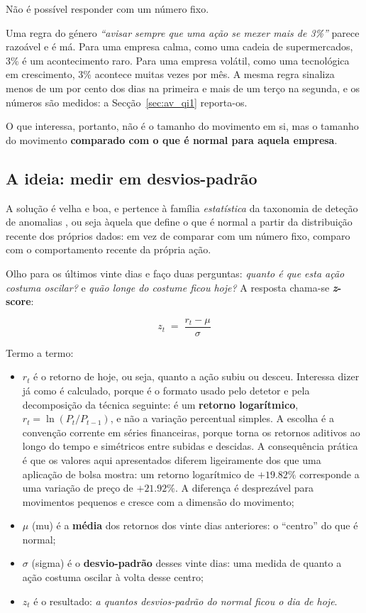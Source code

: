 Não é possível responder com um número fixo.

Uma regra do género \emph{``avisar sempre que uma ação se mexer mais de 3\%''} parece razoável e é
má. Para uma empresa calma, como uma cadeia de supermercados, 3\% é um acontecimento raro. Para uma
empresa volátil, como uma tecnológica em crescimento, 3\% acontece muitas vezes por mês. A mesma
regra sinaliza menos de um por cento dos dias na primeira e mais de um terço na segunda, e os
números são medidos: a Secção~\ref{sec:av_qi1} reporta-os.

O que interessa, portanto, não é o tamanho do movimento em si, mas o tamanho do movimento
\textbf{comparado com o que é normal para aquela empresa}.

\subsection{A ideia: medir em desvios-padrão}

A solução é velha e boa, e pertence à família \emph{estatística} da taxonomia de deteção de anomalias
\autocite{chandola2009anomaly}, ou seja àquela que define o que é normal a partir da distribuição
recente dos próprios dados: em vez de comparar com um número fixo, comparo com o comportamento
recente da própria ação.

Olho para os últimos vinte dias e faço duas perguntas: \emph{quanto é que esta ação costuma oscilar?}
e \emph{quão longe do costume ficou hoje?} A resposta chama-se \textbf{\emph{z}-score}:

\begin{equation}
  z_t \;=\; \frac{r_t - \mu}{\sigma}
  \label{eq:zscore}
\end{equation}

Termo a termo:

\begin{itemize}
  \item $r_t$ é o retorno de hoje, ou seja, quanto a ação subiu ou desceu. Interessa dizer já como
        é calculado, porque é o formato usado pelo detetor e pela decomposição da técnica seguinte: é um
        \textbf{retorno logarítmico}, $r_t = \ln(P_t / P_{t-1})$, e não a variação percentual
        simples. A escolha é a convenção corrente em séries financeiras, porque torna os retornos
        aditivos ao longo do tempo e simétricos entre subidas e descidas. A consequência prática é
        que os valores aqui apresentados diferem ligeiramente dos que uma aplicação de bolsa mostra:
        um retorno logarítmico de $+19.82\%$ corresponde a uma variação de preço de $+21.92\%$. A
        diferença é desprezável para movimentos pequenos e cresce com a dimensão do movimento;
  \item $\mu$ (mu) é a \textbf{média} dos retornos dos vinte dias anteriores: o ``centro'' do que é
        normal;
  \item $\sigma$ (sigma) é o \textbf{desvio-padrão} desses vinte dias: uma medida de quanto a ação
        costuma oscilar à volta desse centro;
  \item $z_t$ é o resultado: \emph{a quantos desvios-padrão do normal ficou o dia de hoje}.
\end{itemize}

